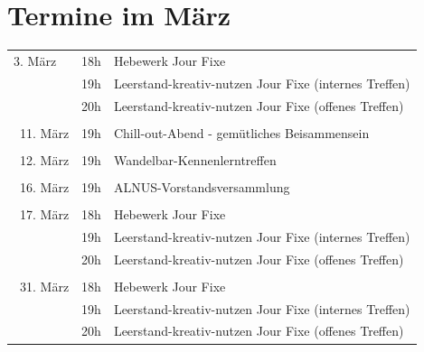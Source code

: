 \documentclass{leaflet}
\begin{document}
\section{Termine im März}
\begin{tabular}{llp{5cm}}
3. März	&18h&Hebewerk Jour Fixe\\     
	&19h&Leerstand-kreativ-nutzen Jour Fixe (internes Treffen)\\
	&20h&Leerstand-kreativ-nutzen Jour Fixe (offenes Treffen)\\
\\\
11. März&19h&Chill-out-Abend  - gemütliches Beisammensein\\
\\\
12. März&19h&Wandelbar-Kennenlerntreffen\\
\\\
16. März&19h&ALNUS-Vorstandsversammlung\\
\\\
17. März&18h&Hebewerk Jour Fixe\\
        &19h&Leerstand-kreativ-nutzen Jour Fixe (internes Treffen)\\
	&20h&Leerstand-kreativ-nutzen Jour Fixe (offenes Treffen)\\
\\\
31. März&18h&Hebewerk Jour Fixe\\
	&19h&Leerstand-kreativ-nutzen Jour Fixe (internes Treffen)\\
	&20h&Leerstand-kreativ-nutzen Jour Fixe (offenes Treffen)\\
\end{tabular}	
\end{document}
